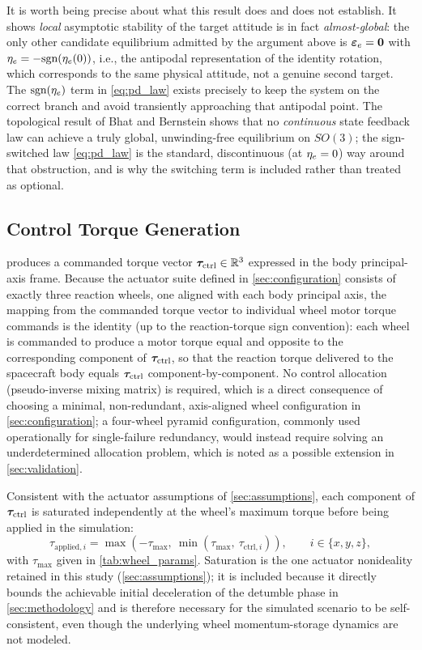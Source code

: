 It is worth being precise about what this result does and does not establish. It shows \emph{local} asymptotic stability of the target attitude is in fact \emph{almost-global}: the only other candidate equilibrium admitted by the argument above is $\bm{\varepsilon}_e=\bm{0}$ with $\eta_e=-\text{sgn}(\eta_e(0))$, i.e., the antipodal representation of the identity rotation, which corresponds to the same physical attitude, not a genuine second target. The $\text{sgn}(\eta_e)$ term in \cref{eq:pd_law} exists precisely to keep the system on the correct branch and avoid transiently approaching that antipodal point. The topological result of Bhat and Bernstein \cite{bhat2000} shows that no \emph{continuous} state feedback law can achieve a truly global, unwinding-free equilibrium on $SO(3)$; the sign-switched law \cref{eq:pd_law} is the standard, discontinuous (at $\eta_e=0$) way around that obstruction, and is why the switching term is included rather than treated as optional.

\subsection{Control Torque Generation}
\label{sec:torque_generation}

 produces a commanded torque vector $\bm{\tau}_{\text{ctrl}}\in\mathbb{R}^3$ expressed in the body principal-axis frame. Because the actuator suite defined in \cref{sec:configuration} consists of exactly three reaction wheels, one aligned with each body principal axis, the mapping from the commanded torque vector to individual wheel motor torque commands is the identity (up to the reaction-torque sign convention): each wheel is commanded to produce a motor torque equal and opposite to the corresponding component of $\bm{\tau}_{\text{ctrl}}$, so that the reaction torque delivered to the spacecraft body equals $\bm{\tau}_{\text{ctrl}}$ component-by-component. No control allocation (pseudo-inverse mixing matrix) is required, which is a direct consequence of choosing a minimal, non-redundant, axis-aligned wheel configuration in \cref{sec:configuration}; a four-wheel pyramid configuration, commonly used operationally for single-failure redundancy, would instead require solving an underdetermined allocation problem, which is noted as a possible extension in \cref{sec:validation}.

Consistent with the actuator assumptions of \cref{sec:assumptions}, each component of $\bm{\tau}_{\text{ctrl}}$ is saturated independently at the wheel's maximum torque before being applied in the simulation:
\begin{equation}
    \tau_{\text{applied},i} = \max\left(-\tau_{\max},\ \min\left(\tau_{\max},\ \tau_{\text{ctrl},i}\right)\right), \qquad i \in \{x,y,z\},
    \label{eq:torque_saturation}
\end{equation}
with $\tau_{\max}$ given in \cref{tab:wheel_params}. Saturation is the one actuator nonideality retained in this study (\cref{sec:assumptions}); it is included because it directly bounds the achievable initial deceleration of the detumble phase in \cref{sec:methodology} and is therefore necessary for the simulated scenario to be self-consistent, even though the underlying wheel momentum-storage dynamics are not modeled.
